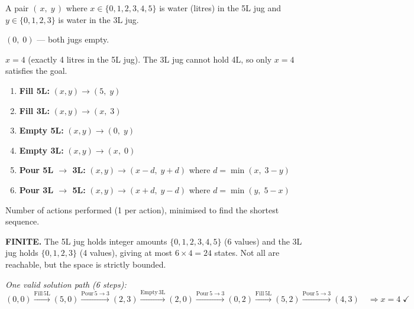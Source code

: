 \documentclass[12pt, a4paper]{article}
\begin{document}
\begin{description}[leftmargin=3.2cm, labelwidth=3cm, labelsep=0.2cm]
  \item[\textbf{State:}]
    A pair $(\,x,\; y\,)$ where $x \in \{0,1,2,3,4,5\}$ is water (litres) in the 5L jug and $y \in \{0,1,2,3\}$ is water in the 3L jug.

  \item[\textbf{Initial state:}]
    $(0,\; 0)$ — both jugs empty.

  \item[\textbf{Goal test:}]
    $x = 4$ (exactly 4 litres in the 5L jug). The 3L jug cannot hold 4L, so only $x=4$ satisfies the goal.

  \item[\textbf{Operators:}]
    \begin{enumerate}[noitemsep]
      \item \textbf{Fill 5L:} $(x,y) \to (5,\;y)$
      \item \textbf{Fill 3L:} $(x,y) \to (x,\;3)$
      \item \textbf{Empty 5L:} $(x,y) \to (0,\;y)$
      \item \textbf{Empty 3L:} $(x,y) \to (x,\;0)$
      \item \textbf{Pour 5L $\to$ 3L:} $(x,y) \to (x{-}d,\;y{+}d)$ where $d = \min(x,\; 3{-}y)$
      \item \textbf{Pour 3L $\to$ 5L:} $(x,y) \to (x{+}d,\;y{-}d)$ where $d = \min(y,\; 5{-}x)$
    \end{enumerate}

  \item[\textbf{Path cost:}]
    Number of actions performed (1 per action), minimised to find the shortest sequence.

  \item[\textbf{State space:}]
    \textbf{FINITE.} The 5L jug holds integer amounts $\{0,1,2,3,4,5\}$ (6 values) and the 3L jug holds $\{0,1,2,3\}$ (4 values), giving at most $6 \times 4 = 24$ states. Not all are reachable, but the space is strictly bounded.

    \textit{One valid solution path (6 steps):}
    \[
    (0,0)
    \xrightarrow{\mathrm{Fill\,5L}} (5,0)
    \xrightarrow{\mathrm{Pour\,5\to3}} (2,3)
    \xrightarrow{\mathrm{Empty\,3L}} (2,0)
    \xrightarrow{\mathrm{Pour\,5\to3}} (0,2)
    \xrightarrow{\mathrm{Fill\,5L}} (5,2)
    \xrightarrow{\mathrm{Pour\,5\to3}} (4,3)
    \quad \Rightarrow x=4 \;\checkmark
    \]
\end{description}
\end{document}
